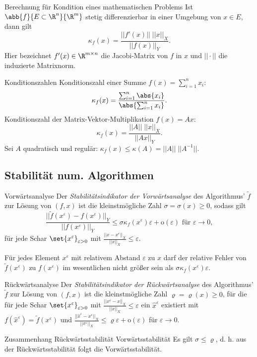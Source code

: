 \begin{karte}{Berechnung für Kondition eines mathematischen Problems}
    Ist \( \abb{f}{E\subset \R^n}{\R^m} \) stetig differenzierbar in einer Umgebung von \( x\in E \), 
    dann gilt 
    \[ \kappa_f(x) = \frac{||f'(x)|| \; ||x||_X }{ ||f(x)||_Y }. \] 
    Hier bezeichnet \( f'(x) \in \R^{m\times n} \) die Jacobi-Matrix von \(f\) in \(x\) und \( ||\cdot|| \) die 
    induzierte Matrixnorm.
\end{karte}

\begin{karte}{Konditionszahlen}
    Konditionszahl einer Summe \( f(x) = \sum_{i=1}^n x_i \):
    \[ \kappa_f(x) = \frac{ \sum_{i=1}^n \abs{x_i} }{ \abs{ \sum_{i=1}^n x_i } }. \]
    Konditionszahl der Matrix-Vektor-Multiplikation \( f(x) = Ax \):
    \[ \kappa_f(x) = \frac{||A||\;||x||_X}{||Ax||_Y}. \]
    Sei \(A\) quadratisch und regulär: \(\kappa_f(x) \leq \kappa(A) = ||A||\;||A^{-1}||\). 
\end{karte}

\subsection*{Stabilität num. Algorithmen}

\begin{karte}{Vorwärtsanalyse}
    Der \textit{Stabilitätsindikator der Vorwärtsanalyse} des Algorithmus' 
    \( \tilde{f} \) zur Lösung von \( (f,x) \) ist die kleinstmögliche Zahl \( \sigma = \sigma(x) \geq 0 \), 
    sodass gilt 
    \[ \frac{ ||\tilde{f}(x^\varepsilon) - f(x^\varepsilon)||_Y }{||f(x^\varepsilon)||_Y} 
    \leq \sigma \kappa_f(x^\varepsilon)\varepsilon + \mathrm{o}(\varepsilon) \text{ für }\varepsilon \rightarrow 0, \]
    für jede Schar \( \set{x^\varepsilon}_{\varepsilon > 0} \) mit \( \frac{ ||x - x^\varepsilon||_X }{ ||x||_X } \leq \varepsilon \).

    Für jedes Element \( x^\varepsilon \) mit relativem Abstand \(\varepsilon\) zu \(x\) darf der relative 
    Fehler von \( \tilde{f}(x^\varepsilon) \) zu \( f(x^\varepsilon) \) im wesentlichen nicht größer sein als 
    \( \sigma \kappa_f(x^\varepsilon)\varepsilon \).
\end{karte}

\begin{karte}{Rückwärtsanalyse}
    Der \textit{Stabilitätsindikator der Rückwärtsanalyse} des Algorithmus' \(\tilde{f}\) 
    zur Lösung von \( (f,x) \) ist die kleinstmögliche Zahl \( \varrho = \varrho(x) \geq 0 \), 
    für die für jede Schar \( \set{x^\varepsilon}_{\varepsilon>0} \) mit 
    \( \frac{||x^\varepsilon - x||_X}{||x||_X} \leq \varepsilon \) ein 
    \( \widehat{x}^\varepsilon \) existiert mit \( f(\widehat{x}^\varepsilon) = \tilde{f}(x^\varepsilon) \) 
    und \( \frac{ ||\widehat{x}^\varepsilon - x^\varepsilon||_X }{||x^\varepsilon||_X} \leq \varrho\varepsilon + \mathrm{o}(\varepsilon) \) 
    für \( \varepsilon \rightarrow 0 \).
\end{karte}

\begin{karte}{Zusammenhang Rückwärtsstabilität Vorwärtsstabilität}
    Es gilt \( \sigma \leq \varrho \), d. h. aus der Rückwärtsstabilität folgt die Vorwärtsstabilität.
\end{karte}